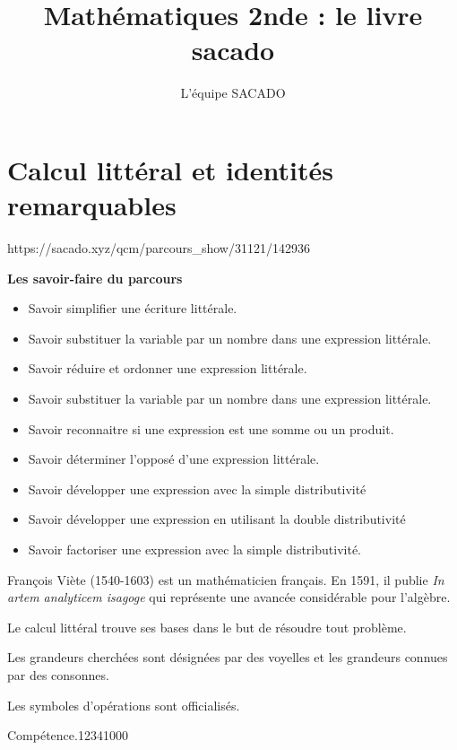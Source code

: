 



\title{Mathématiques 2nde  : le livre sacado}
\author{L'équipe SACADO}




\chapter{Calcul littéral et identités remarquables}
{https://sacado.xyz/qcm/parcours_show/31121/142936}
{
 \begin{CpsCol}
	\textbf{Les savoir-faire du parcours}
 	\begin{itemize}
 		\item Savoir simplifier une écriture littérale.
		\item Savoir substituer la variable par un nombre dans une expression littérale.
		\item Savoir réduire et ordonner une expression littérale.
		\item Savoir substituer la variable par un nombre dans une expression littérale.
		\item Savoir reconnaitre si une expression est une somme ou un produit.
		\item Savoir déterminer l'opposé d'une expression littérale.
		\item Savoir développer une expression avec la simple distributivité
		\item Savoir développer une expression en utilisant la double distributivité
		\item Savoir factoriser une expression avec la simple distributivité.
 	\end{itemize}
 \end{CpsCol}

\begin{His}
François Viète (1540-1603) est un mathématicien français. En 1591, il publie \textit{In artem analyticem isagoge} qui représente une avancée considérable pour l'algèbre.

Le calcul littéral trouve ses bases dans le but de résoudre tout problème.

Les grandeurs cherchées sont désignées par des voyelles et les grandeurs connues par des consonnes.

Les symboles d'opérations sont officialisés.
\end{His}

\begin{ExoDec}{Compétence.}{1234}{1}{0}{0}{0}
\end{ExoDec}
}

